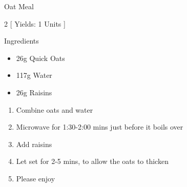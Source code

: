 \begin{Large}
    Oat Meal
\end{Large}

\begin{scriptsize}
\begin{multicols}{2}
[
\vspace{1em}
Yields: 1 Units
\vspace{-1.5em}
]

Ingredients
\begin{itemize}
    \item 26g Quick Oats
    \item 117g Water
    \item 26g Raisins
\end{itemize}
\end{multicols}
\end{scriptsize}

\begin{footnotesize}
\begin{enumerate}
    \item Combine oats and water
    \item Microwave for 1:30-2:00 mins just before it boils over
    \item Add raisins
    \item Let set for 2-5 mins, to allow the oats to thicken
    \item Please enjoy
\end{enumerate}
\end{footnotesize}

\vspace{2em}

